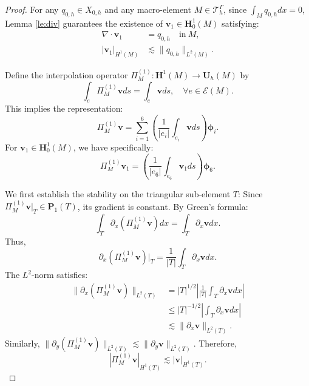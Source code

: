 \documentclass[a4paper,11pt,fleqn]{article}
\numberwithin{equation}{section}
\begin{document}
\begin{proof}
	For any $q_{0,h} \in X_{0,h}$ and any macro-element $M \in \mathcal{T}_h^{\Gamma}$, since $\int_M q_{0,h}  dx = 0$, Lemma \ref{le:div} guarantees the existence of $\boldsymbol{v}_1 \in \bm{H}^1_0(M)$ satisfying:
	\begin{align*}
		\nabla \cdot \boldsymbol{v}_1 &= q_{0,h}\quad \text{in} ~M, \\
		|\boldsymbol{v}_1|_{H^1(M)} &\lesssim \|q_{0,h}\|_{L^2(M)}.
	\end{align*}
	
	Define the interpolation operator $\Pi^{(1)}_M: \bm{H}^1(M) \rightarrow \bm{U}_{h}(M)$ by
	\begin{equation}\label{eq:pi_m^1}
		\int_e \Pi^{(1)}_M \boldsymbol{v}  ds = \int_e \boldsymbol{v}  ds, \quad \forall e \in \mathcal{E}(M).
	\end{equation}
	This implies the representation:
	\[
	\Pi^{(1)}_M \boldsymbol{v} = \sum_{i=1}^{6} \left( \frac{1}{|e_i|} \int_{e_i} \boldsymbol{v}  ds \right) \boldsymbol{\phi}_i.
	\]
	For $\boldsymbol{v}_1 \in \bm{H}^1_0(M)$, we have specifically:
	\[
	\Pi^{(1)}_M \boldsymbol{v}_1 = \left( \frac{1}{|e_6|} \int_{e_6} \boldsymbol{v}_1  ds \right) \boldsymbol{\phi}_6.
	\]
	
	We first establish the stability on the triangular sub-element $T$:
	Since $\Pi^{(1)}_M \boldsymbol{v}|_T \in \bm{P}_1(T)$, its gradient is constant. By Green's formula:
	\[
	\int_T \partial_x (\Pi^{(1)}_M \boldsymbol{v})  dx = \int_T \partial_x \boldsymbol{v}  dx.
	\]
	Thus,
	\[
	\partial_x (\Pi^{(1)}_M \boldsymbol{v})|_T = \frac{1}{|T|} \int_T \partial_x \boldsymbol{v}  dx.
	\]
	The $L^2$-norm satisfies:
	\begin{align*}
		\|\partial_x (\Pi^{(1)}_M \boldsymbol{v})\|_{L^2(T)} 
		&= |T|^{1/2} \left| \frac{1}{|T|} \int_T \partial_x \boldsymbol{v}  dx \right| \\
		&\leq |T|^{-1/2} \left| \int_T \partial_x \boldsymbol{v}  dx \right| \\
		&\lesssim \|\partial_x \boldsymbol{v}\|_{L^2(T)}.
	\end{align*}
	Similarly, $\|\partial_y (\Pi^{(1)}_M \boldsymbol{v})\|_{L^2(T)} \lesssim \|\partial_y \boldsymbol{v}\|_{L^2(T)}$. Therefore,
	\begin{equation}\label{eq:pi_m^1err}
		|\Pi^{(1)}_M \boldsymbol{v}|_{H^1(T)} \lesssim |\boldsymbol{v}|_{H^1(T)}.
	\end{equation}
	

\end{proof}
\end{document}
